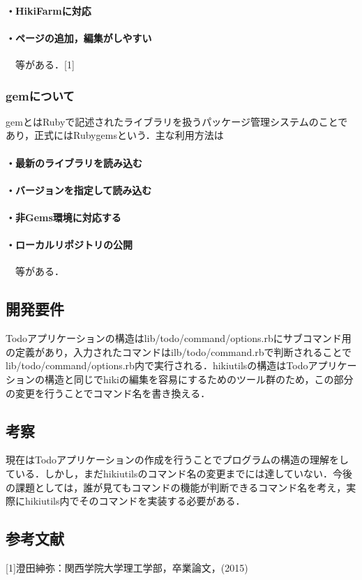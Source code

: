 \documentclass[a4j,twocolumn]{jsarticle}
\begin{document}
\paragraph{・HikiFarmに対応}
\paragraph{・ページの追加，編集がしやすい}
　等がある．[1]

\subsubsection{gemについて}
gemとはRubyで記述されたライブラリを扱うパッケージ管理システムのことであり，正式にはRubygemsという．主な利用方法は

\paragraph{・最新のライブラリを読み込む}
\paragraph{・バージョンを指定して読み込む}
\paragraph{・非Gems環境に対応する}
\paragraph{・ローカルリポジトリの公開}
　等がある．

\subsection{開発要件}
Todoアプリケーションの構造はlib/todo/command/options.rbにサブコマンド用の定義があり，入力されたコマンドはilb/todo/command.rbで判断されることでlib/todo/command/options.rb内で実行される．hikiutilsの構造はTodoアプリケーションの構造と同じでhikiの編集を容易にするためのツール群のため，この部分の変更を行うことでコマンド名を書き換える．

\subsection{考察}
現在はTodoアプリケーションの作成を行うことでプログラムの構造の理解をしている．しかし，まだhikiutilsのコマンド名の変更までには達していない．今後の課題としては，誰が見てもコマンドの機能が判断できるコマンド名を考え，実際にhikiutils内でそのコマンドを実装する必要がある．

\subsection{参考文献}
[1]澄田紳弥：関西学院大学理工学部，卒業論文，(2015)
\end{document}
